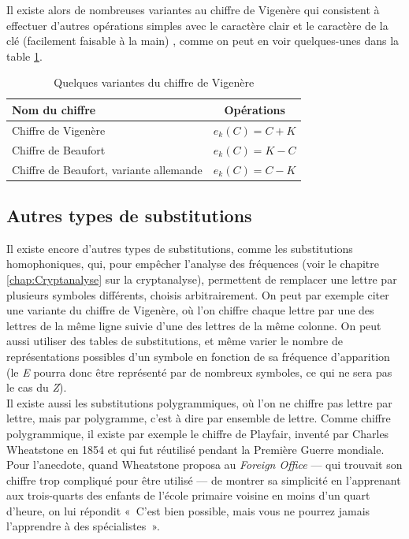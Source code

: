 Il existe alors de nombreuses variantes au chiffre de Vigenère qui
consistent à effectuer d'autres opérations simples avec le caractère
clair et le caractère de la clé (facilement faisable à la main) ,
comme on peut en voir quelques-unes dans la table \ref{tab:VariantesVigenere}. 
\begin{table}[h]
  \caption{Quelques variantes du chiffre de Vigenère}
  \label{tab:VariantesVigenere}
  \begin{center}
    \begin{tabular}{|l|c|}
      \hline
      \textbf{Nom du chiffre} & \textbf{Opérations} \\
      \hline
      Chiffre de Vigenère & $e_k(C) = C + K$ \\ 
      \hline
      Chiffre de Beaufort & $e_k(C) = K - C$ \\
      \hline
      Chiffre de Beaufort, variante allemande & $e_k(C) = C - K$ \\
      \hline
    \end{tabular}
  \end{center}
\end{table}

\subsection{Autres types de substitutions\label{sec:SubstitutionsPolygrammiques}}
Il existe encore d'autres types de substitutions, comme les
substitutions homophoniques, qui, pour empêcher l'analyse des
fréquences (voir le chapitre \ref{chap:Cryptanalyse} sur la
cryptanalyse), permettent de remplacer une lettre par plusieurs
symboles différents, choisis arbitrairement. On peut par exemple citer
une variante du chiffre de Vigenère, où l'on chiffre chaque lettre par
une des lettres de la même ligne suivie d'une des lettres de la même
colonne. On peut aussi utiliser des tables de substitutions, et même
varier le nombre de représentations possibles d'un symbole en fonction
de sa fréquence d'apparition (le \emph{E} pourra donc être représenté par
de nombreux symboles, ce qui ne sera pas le cas du \emph{Z}).\\

Il existe aussi les substitutions polygrammiques, où l'on ne chiffre
pas lettre par lettre, mais par polygramme, c'est à dire par ensemble
de lettre. Comme chiffre polygrammique, il existe par exemple le
chiffre de Playfair, inventé par Charles Wheatstone en 1854 et qui fut
réutilisé pendant la Première Guerre mondiale. Pour l'anecdote,
quand Wheatstone proposa au \emph{Foreign Office} --- qui trouvait son chiffre
trop compliqué pour être utilisé --- de montrer sa simplicité en
l'apprenant aux trois-quarts des enfants de l'école primaire voisine
en moins d'un quart d'heure, on lui répondit «~C'est bien possible,
mais vous ne pourrez jamais l'apprendre à des spécialistes~».


